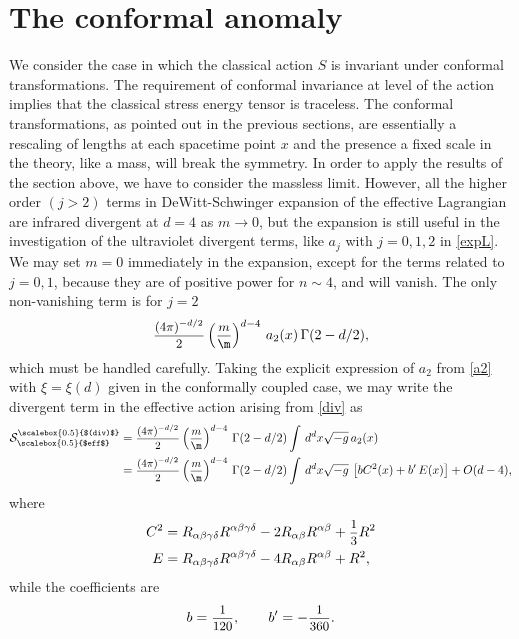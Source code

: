 \documentclass[a4paper,11pt,openright,twoside]{book}
\let\a=\alpha   \let\b=\beta   \let\g=\gamma   \let\d=\delta
\let\G=\Gamma  \let\D=\Delta \let\Q=\Theta  \let\L=\Lambda
\newcommand{\sdfrac}[2]{\mbox{\small$\displaystyle\frac{#1}{#2}$}}
\numberwithin{equation}{section}
\begin{document}
{{{{		\section{The conformal anomaly}
		We consider the case in which the classical action $S$ is invariant under conformal transformations. The requirement of conformal invariance at level of the action implies that the classical stress energy tensor is traceless. The conformal transformations, as pointed out in the previous sections, are essentially a rescaling of lengths at each spacetime point $x$ and the presence a fixed scale in the theory, like a mass, will break the symmetry. In order to apply the results of the section above, we have to consider the massless limit. However, all the higher order $(j>2)$ terms in DeWitt-Schwinger expansion of the effective Lagrangian are infrared divergent at $d=4$ as $m\to0$, but the expansion is still useful in the investigation of the ultraviolet divergent terms, like $a_j$ with $j=0,1,2$ in \eqref{expL}. 
		We may set $m=0$ immediately in the expansion, except for the terms related to $j=0,1$, because they are of positive power for $n\sim4$, and will vanish. The only non-vanishing term is for $j=2$ 
		\begin{equation}
			\sdfrac{(4\pi)^{-d/2}}{2}\left(\sdfrac{m}{\m}\right)^{d-4}\,a_2(x)\,\G(2-d/2),\label{div}
		\end{equation}
		which must be handled carefully. Taking the explicit expression of $a_2$ from \eqref{a2} with $\xi=\xi(d)$ given in the conformally coupled case, we may write the divergent term in the effective action arising from \eqref{div} as
		\begin{align}
			\mathcal{S}_{\scalebox{0.5}{$eff$}}^{\scalebox{0.5}{$(div)$}}&=\sdfrac{(4\pi)^{-d/2}}{2}\left(\sdfrac{m}{\m}\right)^{d-4}\,\G(2-d/2)\int\,d^dx\sqrt{-g}\,a_2(x)\notag\\
			&=\sdfrac{(4\pi)^{-d/2}}{2}\left(\sdfrac{m}{\m}\right)^{d-4}\,\G(2-d/2)\int\,d^dx\sqrt{-g}\,\left[b C^2(x)+b'\,E(x)\right]+O(d-4),\label{anoma1}
		\end{align}
		where
		\begin{equation}
			\begin{split}
				C^2&=R_{\a\b\g\d}R^{\a\b\g\d}-2R_{\a\b}R^{\a\b}+\sdfrac{1}{3}R^2\\
				E&=R_{\a\b\g\d}R^{\a\b\g\d}-4R_{\a\b}R^{\a\b}+R^2,
			\end{split}	\label{FeG}
		\end{equation}
		while the coefficients are
		\begin{equation}
			b=\sdfrac{1}{120},\qquad b'=-\sdfrac{1}{360}.
		\end{equation}
		
}}}}
\end{document}
